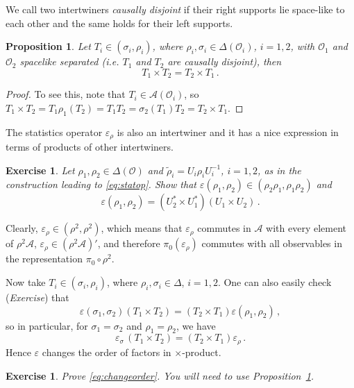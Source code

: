 \documentclass[12pt]{article}
\newcommand{\1}{\mathds{1}}                         %
\newcommand{\Ocal}{\mathcal{O}}
\newcommand{\Ac}{{\mathcal{A}}}
\newcommand{\be}{\begin{equation}}
\newcommand{\ee}{\end{equation}}
\newtheorem{proposition}[theorem]{Proposition}
\newtheorem{exercise}[theorem]{Exercise}
\begin{document}
 We call two intertwiners \textit{causally disjoint} if their right supports lie space-like to each other and the same holds for their left supports. 
\begin{proposition}\label{prop:intcomm}
Let	 $T_i\in(\sigma_i,\rho_i)$, where $\rho_i,\sigma_i\in\Delta(\Ocal_i)$, $i=1,2$, with $\Ocal_1$ and $\Ocal_2$ spacelike separated (i.e. $T_1$ and $T_2$ are causally disjoint), then
\[
T_1\times T_2=T_2\times T_1\,.
\]
\end{proposition}
 \begin{proof}
 	To see this, note that $T_i\in\Ac(\Ocal_i)$, so $T_1\times T_2=T_1\rho_1(T_2)=T_1T_2=\sigma_2(T_1)T_2=T_2\times T_1$.
 \end{proof}
The statistics operator $\varepsilon_\rho$ is also an intertwiner and it has a nice expression in terms of products of other intertwiners.
\begin{exercise} Let $\rho_1,\rho_2\in\Delta(\Ocal)$ and $\tilde{\rho}_i=U_i\rho_i U_i^{-1}$, $i=1,2$, as in the construction leading to \eqref{eq:statop}. Show that $\varepsilon(\rho_1,\rho_2)\in(\rho_2\rho_1,\rho_1\rho_2)$ and 
	\[
	\varepsilon(\rho_1,\rho_2)=(U_2^*\times U_1^*)  (U_1\times U_2)\,.
	\]
\end{exercise}
Clearly, 
$\varepsilon_\rho\in(\rho^2,\rho^2)$, which means that $\varepsilon_\rho$ commutes in $\Ac$ with every element of $\rho^2\Ac$, $\varepsilon_\rho\in (\rho^2\Ac)'$, and therefore $\pi_0(\varepsilon_\rho)$ commutes with all observables in the representation $\pi_0\circ\rho^2$.

Now take $T_i\in (\sigma_i,\rho_i)$, where $\rho_i,\sigma_i\in\Delta$, $i=1,2$. One can also easily check (\textit{Exercise}) that
\be\label{eq:changeorder}
\varepsilon(\sigma_1,\sigma_2)  (T_1\times T_2)=(T_2\times T_1)  \varepsilon(\rho_1,\rho_2)\,,
\ee
so in particular, for $\sigma_1=\sigma_2$ and $\rho_1=\rho_2$, we have
\[
\varepsilon_\sigma \, (T_1\times T_2)=(T_2\times T_1)  \varepsilon_\rho\,.
\]
Hence $\varepsilon$ changes the order of factors in $\times$-product.
\begin{exercise}
	Prove \eqref{eq:changeorder}. You will need to use Proposition~\ref{prop:intcomm}.
\end{exercise}
\end{document}
